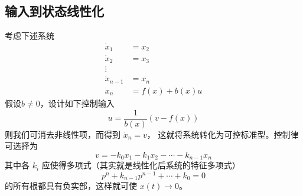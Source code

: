 \subsection{输入到状态线性化}
\begin{example}[可控标准型]
考虑下述系统
    \begin{align*}
    \dot{x}_1 & =  x_2\\
     \dot{x}_2 & =  x_3\\
     \vdots &   \\
     \dot{x}_{n - 1} & = x_n\\
    \dot{x}_n & = f (x) + b (x) u
\end{align*}
假设$b \neq 0$，设计如下控制输入
\[ u = \frac{1}{b (x)} (v - f (x)) \]
则我们可消去非线性项，而得到
$ \dot{x}_n = v $，
这就将系统转化为可控标准型。控制律可选择为
\[ v = - k_0 x_1 - k_1 x_2 - \cdots - k_{n - 1} x_n \]
其中各 $k_i$ 应使得多项式（其实就是线性化后系统的特征多项式）
\[ p^n + k_{n - 1} p^{n - 1} + \cdots + k_0 = 0 \]
的所有根都具有负实部，这样就可使 $x (t) \rightarrow 0$。
\end{example}
